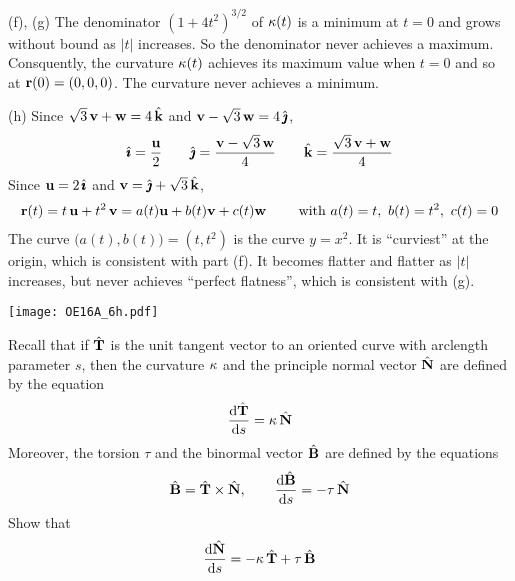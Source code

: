 \begin{solution}
\noindent (f), (g)
The denominator ${(1+4t^2)}^{3/2}$ of $\kappa(t)$ is a minimum at $t=0$ and grows
without bound as $|t|$ increases. So the denominator never achieves
a maximum. Consquently, the curvature $\kappa(t)$ achieves its
maximum value when $t=0$ and so at $\mathbf{r}(0)=(0,0,0)$. The curvature
never achieves a minimum.

\noindent (h)
Since 
$\sqrt{3}\,\mathbf{v}+\mathbf{w}=4\,\hat{\mathbf{k}}$ and $\mathbf{v}-\sqrt{3}\,\mathbf{w}=4\,\hat{\pmb{\jmath}}$,
\begin{equation*}
\hat{\pmb{\imath}}=\frac{\mathbf{u}}{2}\qquad
\hat{\pmb{\jmath}}=\frac{\mathbf{v}-\sqrt{3}\,\mathbf{w}}{4}\qquad
\hat{\mathbf{k}}=\frac{\sqrt{3}\,\mathbf{v}+\mathbf{w}}{4}
\end{equation*}
Since $\mathbf{u}=2\,\hat{\pmb{\imath}}$ and $\mathbf{v}=\hat{\pmb{\jmath}}+\sqrt{3}\,\hat{\mathbf{k}}$,
\begin{align*}
\mathbf{r}(t) = t\,\mathbf{u} + t^2 \,\mathbf{v}
= a(t)\mathbf{u} + b(t)\mathbf{v} + c(t)\mathbf{w}
\qquad\text{ with }a(t)=t,\ b(t)=t^2,\ c(t)=0
\end{align*}
The curve $\big(a(t),b(t)\big)=(t,t^2)$ is the curve $y=x^2$.
It is ``curviest'' at the origin, which is consistent with part (f).
It becomes flatter and flatter as $|t|$ increases, but never achieves
``perfect flatness'', which is consistent with (g).

\begin{center}
       \texttt{[image: OE16A\_6h.pdf]}
\end{center}



\end{solution}



\begin{question}[M317 2017D] %
Recall that if $\hat{\mathbf{T}}$ is the unit tangent vector to an oriented curve 
with arclength parameter $s$, then the curvature $\kappa$ and the principle
normal vector $\hat{\mathbf{N}}$ are defined by the equation
\begin{equation*}
\diff{\hat\vT}{s} = \ka\,\hat\vN
\end{equation*}
Moreover, the torsion $\tau$ and the binormal vector $\hat{\mathbf{B}}$ are defined by
the equations
\begin{equation*}
\hat\vB = \hat\vT\times\hat\vN,\qquad
\diff{\hat\vB}{s} = -\tau\,\hat\vN
\end{equation*} 
Show that
\begin{equation*}
\diff{\hat\vN}{s} = -\ka\,\hat\vT + \tau\,\hat\vB
\end{equation*}
\end{question}


